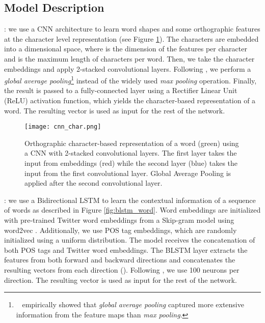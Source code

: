 \documentclass[11pt,letterpaper]{article}
\begin{document}
\subsection{Model Description} \label{model}

: we use a CNN architecture to learn word shapes and some orthographic features at the character level representation (see Figure \ref{fig:cnn_char}). The characters are embedded into a  dimensional space, where  is the dimension of the features per character and  is the maximum length of characters per word. Then, we take the character embeddings and apply 2-stacked convolutional layers. Following \citet{DBLP:journals/corr/ZhouKLOT15}, we perform a \textit{global average pooling}\footnote{~\citet{DBLP:journals/corr/ZhouKLOT15} empirically showed that \textit{global average pooling} captured more extensive information from the feature maps than \textit{max pooling}.} instead of the widely used \textit{max pooling} operation. Finally, the result is passed to a fully-connected layer using a Rectifier Linear Unit (ReLU) activation function, which yields the character-based representation of a word. The resulting vector is used as input for the rest of the network.

\begin{figure}
\centering
\texttt{[image: cnn\_char.png]}
\caption{ \small Orthographic character-based representation of a word (green) using a CNN with 2-stacked convolutional layers. The first layer takes the input from embeddings (red) while the second layer (blue) takes the input from the first convolutional layer. Global Average Pooling is applied after the second convolutional layer.}
\label{fig:cnn_char}
\end{figure}

: we use a Bidirectional LSTM \cite{DBLP:journals/corr/DyerBLMS15} to learn the contextual information of a sequence of words as described in Figure \ref{fig:blstm_word}. Word embeddings are initialized with pre-trained Twitter word embeddings from a Skip-gram model \cite{godin2015multimedia} using word2vec \cite{mikolov2013word2vec}. Additionally, we use POS tag embeddings, which are randomly initialized using a uniform distribution. The model receives the concatenation of both POS tags and Twitter word embeddings. The BLSTM layer extracts the features from both forward and backward directions and concatenates the resulting vectors from each direction (). Following \citet{DBLP:journals/corr/MaH16}, we use 100 neurons per direction. The resulting vector is used as input for the rest of the network.
\end{document}
